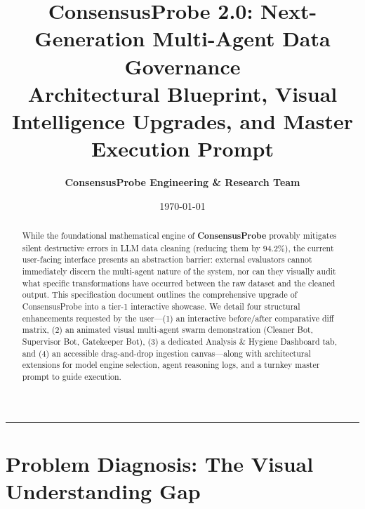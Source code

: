 \documentclass[11pt,a4paper]{article}
\title{\textbf{\LARGE ConsensusProbe 2.0: Next-Generation Multi-Agent Data Governance}\\[0.4em]
\Large Architectural Blueprint, Visual Intelligence Upgrades, and Master Execution Prompt}
\author{\textbf{ConsensusProbe Engineering \& Research Team}}
\date{\today}
\begin{document}
\maketitle

\begin{abstract}
While the foundational mathematical engine of \textbf{ConsensusProbe} provably mitigates silent destructive errors in LLM data cleaning (reducing them by $94.2\%$), the current user-facing interface presents an abstraction barrier: external evaluators cannot immediately discern the multi-agent nature of the system, nor can they visually audit what specific transformations have occurred between the raw dataset and the cleaned output. 
This specification document outlines the comprehensive upgrade of ConsensusProbe into a tier-1 interactive showcase. 
We detail four structural enhancements requested by the user---(1) an interactive before/after comparative diff matrix, (2) an animated visual multi-agent swarm demonstration (Cleaner Bot, Supervisor Bot, Gatekeeper Bot), (3) a dedicated Analysis \& Hygiene Dashboard tab, and (4) an accessible drag-and-drop ingestion canvas---along with architectural extensions for model engine selection, agent reasoning logs, and a turnkey master prompt to guide execution.
\end{abstract}

\tableofcontents
\bigskip
\hrule
\bigskip

\section{Problem Diagnosis: The Visual Understanding Gap}
\label{sec:problem}
\end{document}
